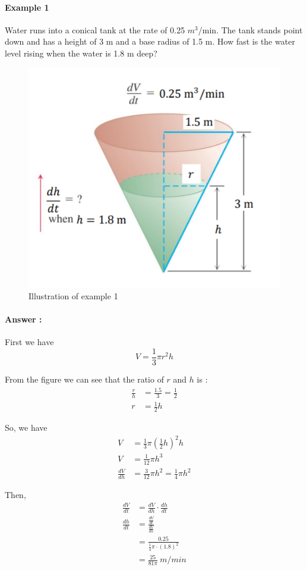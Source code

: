 \documentclass[12pt]{article}
\begin{document}
\paragraph{Example 1}
Water runs into a conical tank at the rate of 0.25 $m^3$/min.
The tank stands point down and has a height of 3 m and a base radius of
1.5 m. How fast is the water level rising when the water is 1.8 m deep?

\begin{figure}[h!] 
    \centering
    \includegraphics[width = 0.4\linewidth]{Images/ex1 chain rule.png}
    \caption{Illustration of example 1}
\end{figure}

\paragraph{Answer :}
First we have 
\[
    V = \frac{1}{3} \pi r^2 h
\]

\noindent 
From the figure we can see that the ratio of $r$ and $h$ is :
\begin{align*} 
    \frac{r}{h} &= \frac{1.5}{3} = \frac{1}{2} \\
    r &= \frac{1}{2} h 
\end{align*}
    
So, we have
\begin{align*} 
     V &= \frac{1}{3} \pi \left( \frac{1}{2} h \right)^2 h \\
     V &= \frac{1}{12} \pi h^3 \\
     \frac{dV}{dh} &= \frac{3}{12} \pi h^2 = \frac{1}{4} \pi h^2
\end{align*}

Then,
\begin{align*} 
    \frac{dV}{dt} &= \frac{dV}{dh} \cdot \frac{dh}{dt} \\
    \frac{dh}{dt} &= \frac{\frac{dV}{dt}}{\frac{dV}{dh}} \\
     &= \frac{0.25}{\frac{1}{4} \pi \cdot (1.8)^2} \\
     &= \frac{25}{81 \pi}\: m/min
\end{align*}
\end{document}
